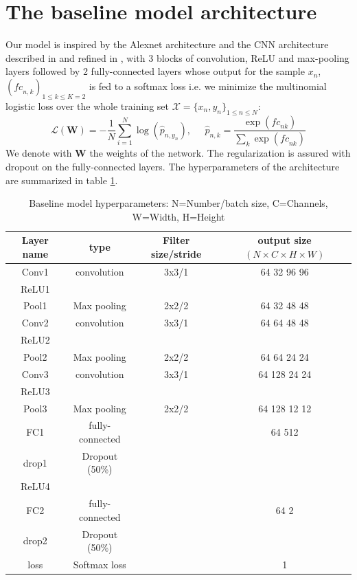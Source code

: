 \documentclass[a4paper]{article}
\newcommand{\W}{\mathbf{W}}
\begin{document}
\section{The baseline model architecture\label{baseline}}%
    Our model is inspired by the Alexnet architecture and the CNN architecture described in \cite{net1} and refined in \cite{net2}, with 3 blocks of convolution, ReLU and max-pooling layers followed by 2 fully-connected layers whose output for the sample $x_n$, $(\mathit{fc}_{n,k})_{1\leq k\leq K=2}$ is fed to a softmax loss i.e. we minimize the multinomial logistic loss over the whole training set $\mathcal X=\{x_n,y_n\}_{1\leq n\leq N}$:
    \begin{equation}
    \label{loss}
    \mathcal L(\mathbf W)=-\frac{1}{N}\sum_{i=1}^N\log(\hat p_{n,y_n}),\phantom{abc}\hat p_{n,k}=\frac{\exp(\mathit{fc}_{nk})}{\sum_k\exp(\mathit{fc}_{nk})}
    \end{equation}
    We denote with $\W$ the weights of the network. The regularization is assured with dropout on the fully-connected layers. The hyperparameters of the architecture are summarized in table \ref{params}.
    \begin{table}[H]
    \centering
    \begin{tabular}{|c|c|c|c|}
    \hline
    Layer name & type                    & Filter size/stride & output size $(N \times C \times H \times W)$\\
    \hline
    Conv1      & convolution             & 3x3/1              & 64 32 96 96\\       
    ReLU1      & & &\\
    Pool1	   & Max pooling             & 2x2/2              & 64 32 48 48\\
    \hline
    Conv2      & convolution             & 3x3/1              & 64 64 48 48\\       
    ReLU2      & & &\\
    Pool2	   & Max pooling             & 2x2/2              & 64 64 24 24\\
    \hline
    Conv3      & convolution             & 3x3/1              & 64 128 24 24\\       
    ReLU3      & & &\\
    Pool3	   & Max pooling             & 2x2/2              & 64 128 12 12\\
    \hline
    FC1        & fully-connected         &                    & 64 512\\
    drop1      & Dropout (50\%)          & &\\
    ReLU4      & & &\\
    \hline
    FC2        & fully-connected         &                    & 64 2\\
    drop2      & Dropout (50\%)          & &\\
    \hline
    loss       & Softmax loss            &                    & 1 \\
    \hline
    \end{tabular}
    \caption{Baseline model hyperparameters\label{params} : N=Number/batch size, C=Channels, W=Width, H=Height}
    \end{table} 
\end{document}
